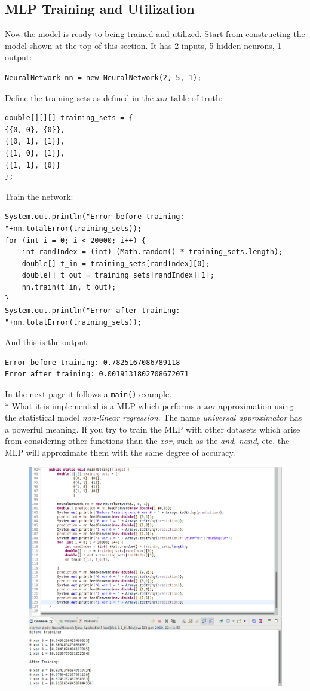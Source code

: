 \documentclass[10pt,a4paper]{article}
\begin{document}
\subsection{MLP Training and Utilization}
Now the model is ready to being trained and utilized. Start from constructing the model shown at the top of this section. It has 2 inputs, 5 hidden neurons, 1 output:
\begin{lstlisting}
NeuralNetwork nn = new NeuralNetwork(2, 5, 1);
\end{lstlisting}
Define the training sets as defined in the \emph{xor} table of truth:
\begin{lstlisting}
double[][][] training_sets = {
{{0, 0}, {0}},
{{0, 1}, {1}},
{{1, 0}, {1}},
{{1, 1}, {0}}
};
\end{lstlisting}
Train the network:
\begin{lstlisting}
System.out.println("Error before training: "+nn.totalError(training_sets));
for (int i = 0; i < 20000; i++) {
	int randIndex = (int) (Math.random() * training_sets.length);
	double[] t_in = training_sets[randIndex][0];
	double[] t_out = training_sets[randIndex][1];
	nn.train(t_in, t_out);
}
System.out.println("Error after training: "+nn.totalError(training_sets));
\end{lstlisting}
And this is the output:
\begin{lstlisting}
Error before training: 0.7825167086789118
Error after training: 0.0019131802708672071
\end{lstlisting}
In the next page it follows a \texttt{main()} example.\\*
What it is implemented is a MLP which performs a \emph{xor} approximation using the statistical model \emph{non-linear regression}. The name \emph{universal approximator} has a powerful meaning. If you try to train the MLP with other datasets which arise from considering other functions than the \emph{xor}, such as the \emph{and}, \emph{nand}, etc, the MLP will approximate them with the same degree of accuracy.
\newpage
\begin{figure}
	\centering
	\includegraphics[scale=1.91]{img/nn}
	\label{fig:nn}
\end{figure}
\end{document}
